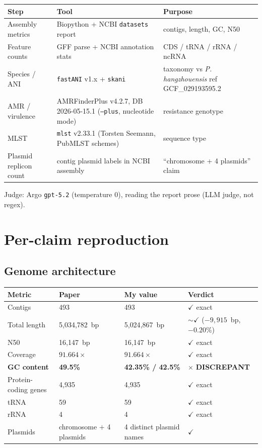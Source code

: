 \documentclass[11pt]{article}
\begin{document}
\begin{longtable}{p{3.3cm}p{4.5cm}p{6.5cm}}
\toprule
\textbf{Step} & \textbf{Tool} & \textbf{Purpose} \\
\midrule
Assembly metrics & Biopython + NCBI \texttt{datasets} report & contigs, length, GC, N50 \\
Feature counts & GFF parse + NCBI annotation stats & CDS / tRNA / rRNA / ncRNA \\
Species / ANI & \texttt{fastANI} v1.x + \texttt{skani} & taxonomy vs \textit{P. hangzhouensis} ref GCF\_029193595.2 \\
AMR / virulence & AMRFinderPlus v4.2.7, DB 2026-05-15.1 (\texttt{--plus}, nucleotide mode) & resistance genotype \\
MLST & \texttt{mlst} v2.33.1 (Torsten Seemann, PubMLST schemes) & sequence type \\
Plasmid replicon count & contig plasmid labels in NCBI assembly & ``chromosome + 4 plasmids'' claim \\
\bottomrule
\end{longtable}

Judge: Argo \texttt{gpt-5.2} (temperature 0), reading the report prose (LLM judge, not regex).

\section{Per-claim reproduction}

\subsection{Genome architecture}
\begin{longtable}{p{4cm}p{3cm}p{4cm}p{3cm}}
\toprule
\textbf{Metric} & \textbf{Paper} & \textbf{My value} & \textbf{Verdict} \\
\midrule
Contigs & 493 & 493 & $\checkmark$ exact \\
Total length & 5{,}034{,}782~bp & 5{,}024{,}867~bp & $\sim\checkmark$ ($-9{,}915$~bp, $-0.20\%$) \\
N50 & 16{,}147~bp & 16{,}147~bp & $\checkmark$ exact \\
Coverage & $91.664\times$ & $91.664\times$ & $\checkmark$ exact \\
\textbf{GC content} & \textbf{49.5\%} & \textbf{42.35\% / 42.5\%} & $\times$ \textbf{DISCREPANT} \\
Protein-coding genes & 4{,}935 & 4{,}935 & $\checkmark$ exact \\
tRNA & 59 & 59 & $\checkmark$ exact \\
rRNA & 4 & 4 & $\checkmark$ exact \\
Plasmids & chromosome $+$ 4 plasmids & 4 distinct plasmid names & $\checkmark$ \\
\bottomrule
\end{longtable}
\end{document}
